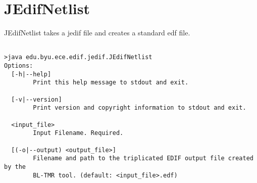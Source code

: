\section{JEdifNetlist}
JEdifNetlist takes a jedif file and creates a standard edf file.
\begin{verbatim}

>java edu.byu.ece.edif.jedif.JEdifNetlist
Options:
  [-h|--help]
        Print this help message to stdout and exit.

  [-v|--version]
        Print version and copyright information to stdout and exit.

  <input_file>
        Input Filename. Required.

  [(-o|--output) <output_file>]
        Filename and path to the triplicated EDIF output file created by the
        BL-TMR tool. (default: <input_file>.edf)

\end{verbatim}
